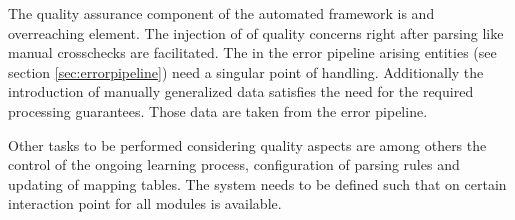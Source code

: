 The quality assurance component of the automated framework is and overreaching element. The injection of of quality concerns right after parsing like manual crosschecks are facilitated. The in the error pipeline arising entities (see section \ref{sec:errorpipeline}) need a singular point of handling. Additionally the introduction of manually generalized data satisfies the need for the required processing guarantees. Those data are taken from the error pipeline. 

Other tasks to be performed considering quality aspects are among others the control of the ongoing learning process, configuration of parsing rules and updating of mapping tables. The system needs to be defined such that on certain interaction point for all modules is available.
